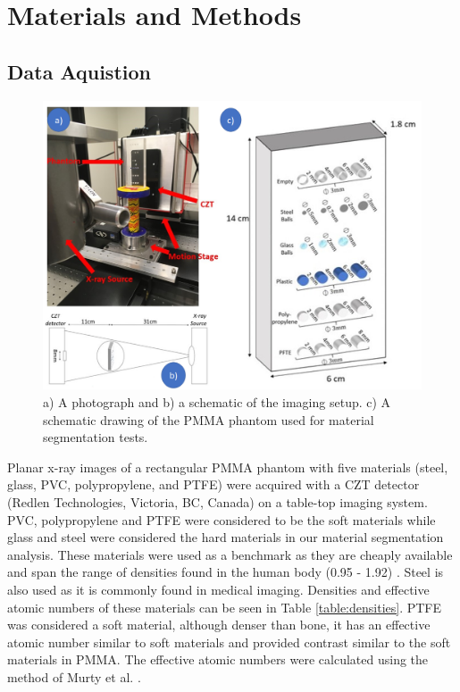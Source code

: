 \documentclass[a4paper,11pt]{article}
\begin{document}

\section{Materials and Methods}
\label{sec:methods}


\subsection{Data Aquistion}

\begin{figure}[htbp]


\includegraphics[width=\textwidth]{figures/aquisition2.png}

  
  \caption{a) A photograph and b) a schematic of the imaging setup. c) A schematic drawing of the PMMA phantom used for material segmentation tests.}
  \label{figure:setup}
\end{figure}


Planar x-ray images of a rectangular PMMA phantom with five materials (steel, glass, PVC, polypropylene, and PTFE) were acquired with a CZT detector (Redlen Technologies, Victoria, BC, Canada) on a table-top imaging system. PVC, polypropylene and PTFE were considered to be the soft materials while glass and steel were considered the hard materials in our material segmentation analysis. These materials were used as a benchmark as they are cheaply available and span the range of densities found in the human body (0.95 - 1.92) \cite{White1989Report44}. Steel is also used as it is commonly found in medical imaging. Densities and effective atomic numbers of these materials can be seen in Table \ref{table:densities}. PTFE was considered a soft material, although denser than bone, it has an effective atomic number similar to soft materials and provided contrast similar to the soft materials in PMMA. The effective atomic numbers were calculated using the method of Murty et al. \cite{MURTY1965EffectiveMaterials}.
\end{document}
